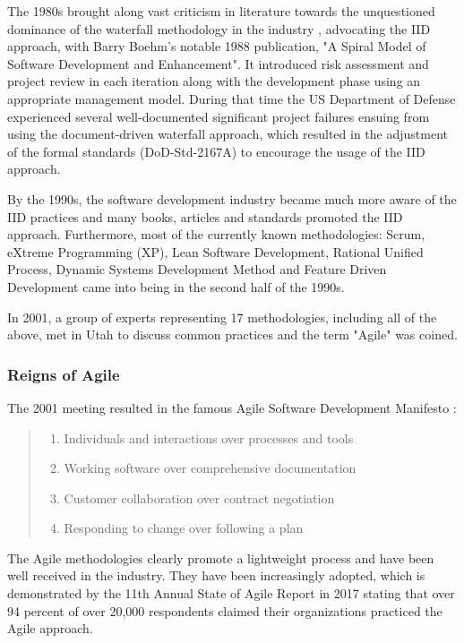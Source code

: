 \documentclass{article}
\begin{document}
The 1980s brought along vast criticism in literature towards the unquestioned dominance of the waterfall methodology in the industry \citep{larman2003iterative}, advocating the IID approach, with Barry Boehm's notable 1988 publication, "A Spiral Model of Software Development and Enhancement". It introduced risk assessment and project review in each iteration along with the development phase using an appropriate management model. During that time the US Department of Defense experienced several well-documented significant project failures ensuing from using the document-driven waterfall approach, which resulted in the adjustment of the formal standards (DoD-Std-2167A) to encourage the usage of the IID approach.

By the 1990s, the software development industry became much more aware of the IID practices and many books, articles and standards promoted the IID approach. Furthermore, most of the currently known methodologies: Scrum, eXtreme Programming (XP), Lean Software Development, Rational Unified Process, Dynamic Systems Development Method and Feature Driven Development came into being in the second half of the 1990s.

In 2001, a group of experts representing 17 methodologies, including all of the above, met in Utah to discuss common practices and the term "Agile" was coined.

\subsubsection{Reigns of Agile}

The 2001 meeting resulted in the famous Agile Software Development Manifesto \citep{beck2001Agile}:
\begin{quote}
\begin{enumerate}
  \item Individuals and interactions over processes and tools
  \item Working software over comprehensive documentation
  \item Customer collaboration over contract negotiation
  \item Responding to change over following a plan
\end{enumerate}
\end{quote}

The Agile methodologies clearly promote a lightweight process and have been well received in the industry. They have been increasingly adopted, which is demonstrated by the 11th Annual State of Agile Report in 2017 \citep{one201711th} stating that over 94 percent of over 20,000 respondents claimed their organizations practiced the Agile approach.
\end{document}
